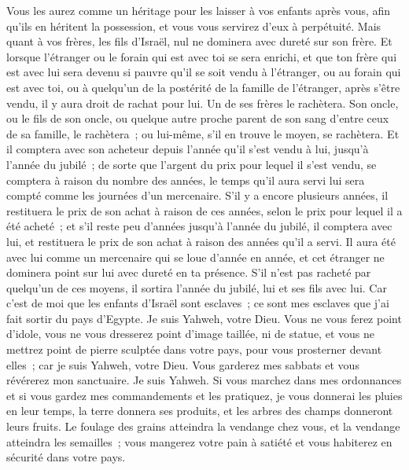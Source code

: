 \begin{multicols}{2}
Vous les aurez comme un héritage pour les laisser à vos enfants après vous, afin qu'ils en héritent la possession, et vous vous servirez d'eux à perpétuité. Mais quant à vos frères, les fils d'Israël, nul ne dominera avec dureté sur son frère.
Et lorsque l'étranger ou le forain qui est avec toi se sera enrichi, et que ton frère qui est avec lui sera devenu si pauvre qu'il se soit vendu à l'étranger, ou au forain qui est avec toi, ou à quelqu'un de la postérité de la famille de l'étranger,
après s'être vendu, il y aura droit de rachat pour lui. Un de ses frères le rachètera.
Son oncle, ou le fils de son oncle, ou quelque autre proche parent de son sang d'entre ceux de sa famille, le rachètera~; ou lui-même, s'il en trouve le moyen, se rachètera.
Et il comptera avec son acheteur depuis l'année qu'il s'est vendu à lui, jusqu'à l'année du jubilé~; de sorte que l'argent du prix pour lequel il s'est vendu, se comptera à raison du nombre des années, le temps qu'il aura servi lui sera compté comme les journées d'un mercenaire.
S'il y a encore plusieurs années, il restituera le prix de son achat à raison de ces années, selon le prix pour lequel il a été acheté~;
et s'il reste peu d'années jusqu'à l'année du jubilé, il comptera avec lui, et restituera le prix de son achat à raison des années qu'il a servi.
Il aura été avec lui comme un mercenaire qui se loue d'année en année, et cet étranger ne dominera point sur lui avec dureté en ta présence.
S'il n'est pas racheté par quelqu'un de ces moyens, il sortira l'année du jubilé, lui et ses fils avec lui.
Car c'est de moi que les enfants d'Israël sont esclaves~; ce sont mes esclaves que j'ai fait sortir du pays d'Egypte. Je suis Yahweh, votre Dieu.
\VerseOne{}Vous ne vous ferez point d'idole, vous ne vous dresserez point d'image taillée, ni de statue, et vous ne mettrez point de pierre sculptée dans votre pays, pour vous prosterner devant elles~; car je suis Yahweh, votre Dieu.
Vous garderez mes sabbats et vous révérerez mon sanctuaire. Je suis Yahweh.
Si vous marchez dans mes ordonnances et si vous gardez mes commandements et les pratiquez,
je vous donnerai les pluies en leur temps, la terre donnera ses produits, et les arbres des champs donneront leurs fruits.
Le foulage des grains atteindra la vendange chez vous, et la vendange atteindra les semailles~; vous mangerez votre pain à satiété et vous habiterez en sécurité dans votre pays.

\end{multicols}

